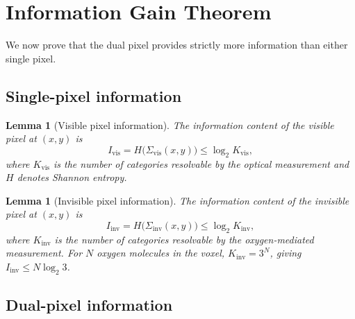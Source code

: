 \documentclass[11pt,twocolumn,a4paper]{article}
\newtheorem{lemma}[theorem]{Lemma}
\newcommand{\Sigvis}{\Sigma_{\mathrm{vis}}}
\newcommand{\Siginv}{\Sigma_{\mathrm{inv}}}
\begin{document}
\section{Information Gain Theorem}\label{sec:information}

We now prove that the dual pixel provides strictly more information than either single pixel.

\subsection{Single-pixel information}

\begin{lemma}[Visible pixel information]\label{lem:vis_info}
The information content of the visible pixel at $(x,y)$ is
\begin{equation}\label{eq:vis_info}
I_{\mathrm{vis}} = H\bigl(\Sigvis(x,y)\bigr) \leq \log_2 K_{\mathrm{vis}},
\end{equation}
where $K_{\mathrm{vis}}$ is the number of categories resolvable by the optical measurement and $H$ denotes Shannon entropy.
\end{lemma}

\begin{lemma}[Invisible pixel information]\label{lem:inv_info}
The information content of the invisible pixel at $(x,y)$ is
\begin{equation}\label{eq:inv_info}
I_{\mathrm{inv}} = H\bigl(\Siginv(x,y)\bigr) \leq \log_2 K_{\mathrm{inv}},
\end{equation}
where $K_{\mathrm{inv}}$ is the number of categories resolvable by the oxygen-mediated measurement.
For $N$ oxygen molecules in the voxel, $K_{\mathrm{inv}} = 3^N$, giving $I_{\mathrm{inv}} \leq N\log_2 3$.
\end{lemma}

\subsection{Dual-pixel information}
\end{document}
